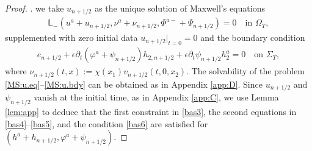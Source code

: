 \documentclass[twoside,11pt]{article}
\numberwithin{equation}{section}
\def\p{\partial}
\begin{document}
\begin{proof}
	
	
	\vspace*{2mm}
	.\quad	
	we take ${u}_{n+1/2} $ as the unique solution of Maxwell's equations
	\begin{align}    \label{MS:u.eq}
		\mathbb{L}_-(u^{a}+{u}_{n+1/2},\nu^{a}+{\nu}_{n+1/2},\Phi^{a-}+\Psi_{n+1/2})=0
		\quad\textrm{in }\Omega_{T},
	\end{align}
	supplemented with  zero initial data ${u}_{n+1/2} |_{t=0}=0$ and
	the boundary condition
	\begin{align}
		{e_{n+1/2}+\epsilon \p_t(\varphi^a+\psi_{n+1/2})h_{2, n+1/2}+\epsilon\p_t \psi_{n+1/2}h_2^a
			=0\quad\textrm{on } \Sigma_T, }
		\label{MS:u.bdy}		
	\end{align}
	where $\nu_{n+1/2}(t,x):=\chi(x_1)v_{n+1/2}(t,0,x_2)$.
	The solvability of the problem \eqref{MS:u.eq}--\eqref{MS:u.bdy} can be obtained as in Appendix \ref{app:D}.
	Since ${u}_{n+1/2}$ and $\psi_{{n}+1/2}$ vanish at the initial time, as in Appendix \ref{app:C},
	we use Lemma \ref{lem:app} to deduce
	that
	the first constraint in \eqref{bas3}, the second equations in \eqref{bas4}--\eqref{bas5}, and the condition \eqref{bas6}
	are satisfied for $(h^a+h_{n+1/2},\varphi^a+\psi_{n+1/2})$.
	

\end{proof}
\end{document}
